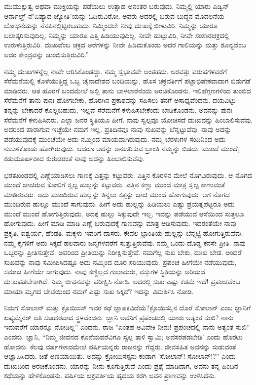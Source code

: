 ಮುಮುಕ್ಷುತ್ವ ಅಥವಾ ಮುಕ್ತಿಯನ್ನು ಪಡೆಯಲು ಉತ್ಸಾಹ ಅನಂತರ ಬರುವುದು. ನಿಮ್ಮಲ್ಲಿ ಯಾರು ಎಡ್ವಿನ್ ಆರ್ನಾಲ್ಡ್ ನ"ಏಷ್ಯಾದ ಜ್ಯೋತಿ'ಯನ್ನು ಓದಿರುವಿರೋ, ಅವರು ಅದರಲ್ಲಿ ಬರುವ ಬುದ್ಧನ ಮೊದಲನೆಯ ಬೋಧನೆಯನ್ನು ನೆನಪಿನಲ್ಲಿಟ್ಟಿರಬಹುದು. ನಿಮ್ಮಿಂದಲೇ ನೀವು ದುಃಖಕ್ಕೆ ಬೀಳುವಿರಿ. ನಿಮ್ಮನ್ನು ಯಾರೂ ಬಲಾತ್ಕರಿಸುವುದಿಲ್ಲ. ನಿಮ್ಮನ್ನು ಯಾರೂ ಎತ್ತಿ ಹಿಡಿಯುವುದಿಲ್ಲ. ನೀವೇ ಹುಟ್ಟುವಿರಿ, ನೀವೇ ಸಂಸಾರಚಕ್ರದಲ್ಲಿ ಉರುಳುತ್ತಿರುವಿರಿ. ದುಃಖವೆಂಬ ಚಕ್ರದ ಅರೆಗಳನ್ನು ನೀವೇ ಹಿಡಿದುಕೊಂಡು ಅದರ ಗಾಲಿಯನ್ನು ಮತ್ತು ಶೂನ್ಯವೆಂಬ ಅದರ ಕೇಂದ್ರವನ್ನು ಚುಂಬಿಸುತ್ತಿರುವಿರಿ.”

ನಮ್ಮ ದುಃಖಗಳನ್ನೆಲ್ಲ ನಾವೇ ಆರಿಸಿಕೊಂಡದ್ದು. ನಮ್ಮ ಸ್ವಭಾವವೇ ಅಂತಹದು. ಅರವತ್ತು ವರುಷಗಳವರೆಗೆ ಸೆರೆಮನೆಯಲ್ಲಿ ಕೊಳೆಯುತ್ತಿದ್ದ ಒಬ್ಬ ಚೈನಾದೇಶದ ಬಂದಿಯನ್ನು, ಹೊಸ ಚಕ್ರವರ್ತಿಗೆ ಪಟ್ಟಾಭಿಷೇಕವಾದಾಗ ಬಿಡುಗಡೆ ಮಾಡಿದರು. ಆತ ಹೊರಗೆ ಬಂದಮೇಲೆ ಅಲ್ಲಿ ತಾನು ಬಾಳಲಾರೆನೆಂದು ಅರಚಿಕೊಂಡನು. ಇಲಿ\break ಹೆಗ್ಗಣಗಳಿಂದ ತುಂಬಿದ ಸೆರೆಮನೆಗೆ ತಾನು ಪುನಃ ಹೋಗಬೇಕು, ಹೊರಗಿನ ಪ್ರಕಾಶವನ್ನು ಸಹಿಸಲು ತನಗೆ ಅಸಾಧ್ಯವೆಂದನು. ದಯವಿಟ್ಟು ತನ್ನನ್ನು ಬೇಕಾದರೆ ಕೊಲ್ಲಬಹುದು, ಇಲ್ಲವೆ ಸೆರೆಮನೆಗೆ ಕಳುಹಿಸಬೇಕೆಂದು ಬೇಡಿಕೊಂಡನು. ಅವನನ್ನು ಪುನಃ ಸೆರೆಮನೆಗೆ ಕಳುಹಿಸಿದರು. ಎಲ್ಲಾ ಜನರ ಸ್ಥಿತಿಯೂ ಹೀಗೆ. ನಾವು ಸ್ವಲ್ಪವೂ ಯೋಚಿಸದೆ ದುಃಖವನ್ನು ಹಿಂಬಾಲಿಸುವೆವು. ಅದರಿಂದ ಪಾರಾಗುವ ಇಚ್ಛೆಯೇ ನಮಗೆ ಇಲ್ಲ. ಪ್ರತಿದಿನವೂ ನಾವು ಸುಖವನ್ನು ಬೆನ್ನಟ್ಟುವೆವು. ನಾವು ಅದನ್ನು ಪಡೆಯುವುದಕ್ಕೆ ಮುಂಚೆಯೇ ಅದು ನಮ್ಮಿಂದ ಮಾಯವಾಗಿರುವುದು. ನಮ್ಮ ಬೆರಳುಗಳ ಸಂದಿನಿಂದ ಅದು ನುಸುಳಿಕೊಂಡು ಹೋಗಿರುವುದು. ಆದರೂ ಅದನ್ನು ಅನುಸರಿಸುವ ಬ್ರಾಂತಿ ನಮ್ಮನ್ನು ಬಿಡದು. ಮುಂದೆ ಮುಂದೆ, ಕಡುಮೂರ್ಖರಾದ ಕುರುಡರಂತೆ ನಾವು ಅದನ್ನು ಹಿಂಬಾಲಿಸುವೆವು.

ಭರತಖಂಡದಲ್ಲಿ ಎಣ್ಣೆಯಾಡಿಸಲು ಗಾಣಕ್ಕೆ ಎತ್ತನ್ನು ಕಟ್ಟುವರು. ಎತ್ತಿನ ಕೊರಳಿನ ಮೇಲೆ ನೊಗವಿರುವುದು. ಆ ನೊಗದ ಮುಂದೆ ಚಾಚಿರುವ ಕೋಲಿಗೆ ಸ್ವಲ್ಪ ಹುಲ್ಲನ್ನು ಕಟ್ಟುವರು. ಎತ್ತಿನ ಕಣ್ಣು ಮುಂದೆ ಮಾತ್ರ ಸ್ವಲ್ಪ ಕಾಣುವಂತೆ ಮಾಡಿರುವರು. ಅದು ಮುಂದಿರುವ ಹುಲ್ಲನ್ನು ತಿನ್ನಲು ಕತ್ತನ್ನು ಚಾಚಿ ಮುಂದೆ ಹೋಗುವುದು. ಆಗ ನೊಗದ ಮುಂದಿರುವ ಹುಲ್ಲೂ ಮುಂದೆ ಸಾಗುವುದು. ಹೀಗೆ ಅದು ಹುಲ್ಲನ್ನು ಹಿಡಿಯಲು ಎಷ್ಟು ಪ್ರಯತ್ನಪಟ್ಟರೂ ಅದು ಮುಂದೆ ಮುಂದೆ ಹೋಗುತ್ತಿರುವುದು. ಅದಕ್ಕೆ ಹುಲ್ಲು ಸಿಕ್ಕುವುದೇ ಇಲ್ಲ. ಇದನ್ನು ಪಡೆಯುವ ಆಸೆಯಿಂದ ಸುತ್ತಲೂ ಹೋಗುವುದು. ಹೀಗೆ ಮಾಡಿ ಮಾಡಿ ಎಣ್ಣೆ ಬರುವುದಕ್ಕೆ ಗಾಣವನ್ನು ಮಾತ್ರ ಆಡಿಸುವುದು. ಇದರಂತೆಯೇ ನಾವು ಪ್ರಕೃತಿ, ಐಶ್ವರ್ಯ, ಹೆಂಡತಿ, ಮಕ್ಕಳು ಇವರಿಗೆ ದಾಸರು. ಕೇವಲ ಭ್ರಾಂತಿಯ ಹುಲ್ಲನ್ನು ಬೆನ್ನಟ್ಟಿ ಹೋಗುತ್ತಿರುವೆವು. ನಮ್ಮ ಕೈಗಳಿಗೆ ಅದು ಸಿಕ್ಕದೆ ಹಲವಾರು ಜನ್ಮಗಳವರೆಗೆ ಸುತ್ತುತ್ತಿರುವೆವು. ನಮ್ಮ ಒಂದು ದೊಡ್ಡ ಕನಸೇ ಪ್ರೀತಿ. ನಾವು ಒಬ್ಬರನ್ನು ಪ್ರೀತಿಸುತ್ತೇವೆ. ಅವರಿಂದ ಪ್ರೀತಿಯನ್ನು ನಿರೀಕ್ಷಿಸುತ್ತೇವೆ. ನಮಗೆಲ್ಲ ಸುಖ ಬೇಕು, ದುಃಖ ಬೇಡ. ಅಂದರೆ ಸುಖವನ್ನು ನಾವು ಸಮೀಪಿಸಿದಷ್ಟೂ ಅದು ನಮ್ಮಿಂದ ದೂರ ಸರಿಯುವುದು. ಪ್ರಪಂಚ ಹೀಗೆಯೇ ನಡೆಯುವುದು, ಸಮಾಜ ಹೀಗೆಯೇ ಸಾಗುವುದು. ನಾವು ಕಣ್ಣಿಲ್ಲದ ಗುಲಾಮರು, ವಸ್ತುಗಳ ಸ್ಥಿತಿಯನ್ನು ಅರಿಯದೆ ದುಃಖಪಡಬೇಕಾಗಿದೆ. ನಿಮ್ಮ ಜೀವನವನ್ನು ಪರೀಕ್ಷಿಸಿ ನೋಡಿ. ಅದರಲ್ಲಿ ಸುಖ ಎಷ್ಟು ಕಡಮೆ ಇದೆ! ಪ್ರಪಂಚವೆಂಬ ಮಾಯಾ ಮೃಗದ ಬೇಟೆಯಿಂದ ನಮಗೆ ಎಷ್ಟು ಸುಖ ಸಿಕ್ಕಿದೆ? ಇದನ್ನು ವಿಮರ್ಶಿಸಿ ನೋಡಿ.

ನಿಮಗೆ ಸೋಲಾನ್ ಮತ್ತು ಕ್ರೊಯಿಸಸ್ ಇವರ ಕಥೆ ಜ್ಞಾಪಕವಿದೆಯೆ?\break ಕ್ರೊಯಿಸಸ್ಸಿನ ದೊರೆ ಸೋಲಾನ್ ಎಂಬ ಜ್ಞಾನಿಗೆ ಏಷ್ಯಮೈನರ್ ಅತಿ ಸುಖಕರವಾದ ಸ್ಥಳವೆಂದನು. ಜ್ಞಾನಿ ಅವನಿಗೆ ಪ್ರಪಂಚದಲ್ಲಿ ಯಾರು ಅತ್ಯಂತ ಸುಖಿ? ನಾನು ಇದುವರೆಗೆ ಯಾರನ್ನೂ ನೋಡಿಲ್ಲ” ಎಂದನು. ರಾಜ "ಎಂತಹ ಅವಿವೇಕಿ ನೀನು! ಪ್ರಪಂಚದಲ್ಲಿ ನಾನು ಅತ್ಯಂತ ಸುಖಿ'' ಎಂದನು. ಜ್ಞಾನಿ, “ನಿಮ್ಮ ಜೀವನದ ಕೊನೆಯವರೆವಿಗೂ ಸ್ವಲ್ಪ ತಾಳಿ ಸ್ವಾಮಿ; ಅವಸರಪಡಬೇಡಿ' ಎಂದು ಹೊರಟು ಹೋದನು. ಕೆಲವು ವರ್ಷಗಳಾದಮೇಲೆ ಪರ್ಷಿಯನ್ನರು ರಾಜನನ್ನು ಗೆದ್ದರು. ಜೀವಸಹಿತ ಅವನನ್ನು ಸುಡುವಂತೆ ಆಜ್ಞಾಪಿಸಿದರು. ಚಿತೆ ಅಣಿಯಾಯಿತು. ಅದನ್ನು ಕ್ರೋಯಿಸಸ್ಸನು ಕಂಡಾಗ 'ಸೋಲಾನ್! ಸೋಲಾನ್!?” ಎಂದು ದುಃಖದಿಂದ ಅರಚಿಕೊಂಡನು. ಯಾರನ್ನು ನೀನು ಕೂಗುತ್ತಿರುವೆ ಎಂದು ಪ್ರಶ್ನೆ ಮಾಡಿದಾಗ, ಅವನು ತನ್ನ ಹಿಂದಿನ ಕಥೆಯನ್ನು ಹೇಳಿಕೊಂಡನು. ಪರ್ಷಿಯ ಚಕ್ರವರ್ತಿಯ ಹೃದಯ ಕರಗಿ ಅವನ ಪ್ರಾಣವನ್ನು ಉಳಿಸಿದನು.


